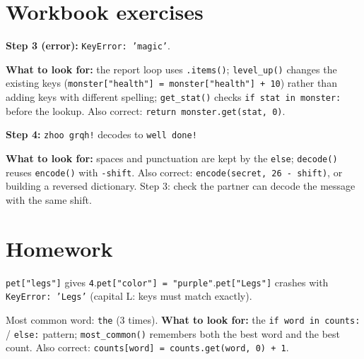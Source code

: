
\section{Workbook exercises}
\begin{answer}
\textbf{Step 3 (error):} \texttt{KeyError: 'magic'}.\par
\textbf{What to look for:} the report loop uses \texttt{.items()}; \texttt{level\_up()} changes the existing keys
(\texttt{monster["health"] = monster["health"] + 10}) rather than adding keys with different spelling;
\texttt{get\_stat()} checks \texttt{if stat in monster:} before the lookup. Also correct: \texttt{return monster.get(stat, 0)}.
\end{answer}

\begin{answer}
\textbf{Step 4:} \texttt{zhoo grqh!} decodes to \texttt{well done!}\par
\textbf{What to look for:} spaces and punctuation are kept by the \texttt{else}; \texttt{decode()} reuses \texttt{encode()} with \texttt{-shift}.
Also correct: \texttt{encode(secret, 26 - shift)}, or building a reversed dictionary. Step 3: check the partner can decode the message
with the same shift.
\end{answer}

\section{Homework}
\begin{answer}
\texttt{pet["legs"]} gives \texttt{4}.\quad \texttt{pet["color"] = "purple"}.\quad \texttt{pet["Legs"]} crashes with
\texttt{KeyError: 'Legs'} (capital L: keys must match exactly).
\end{answer}

\begin{answer}
Most common word: \texttt{the} (3 times).
\textbf{What to look for:} the \texttt{if word in counts:} / \texttt{else:} pattern; \texttt{most\_common()} remembers both the best word and the best count.
Also correct: \texttt{counts[word] = counts.get(word, 0) + 1}.
\end{answer}


